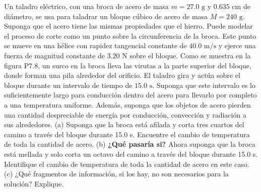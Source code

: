 \item Un taladro eléctrico, con una broca de acero de masa $m = 27.0 \text{ g}$ y $0.635 \text{ cm}$ de diámetro, se usa para taladrar un bloque cúbico de acero de masa $M = 240 \text{ g}$. Suponga que el acero tiene las mismas propiedades que el hierro. Puede modelar el proceso de corte como un punto sobre la circunferencia de la broca. Este punto se mueve en una hélice con rapidez tangencial constante de $40.0 \text{ m/s}$ y ejerce una fuerza de magnitud constante de $3.20 \text{ N}$ sobre el bloque. Como se muestra en la figura P7.8, un surco en la broca lleva las virutas a la parte superior del bloque, donde forman una pila alrededor del orificio. El taladro gira y actúa sobre el bloque durante un intervalo de tiempo de $15.0 \text{ s}$. Suponga que este intervalo es lo suficientemente largo para conducción dentro del acero para llevarlo por completo a una temperatura uniforme. Además, suponga que los objetos de acero pierden una cantidad despreciable de energía por conducción, convección y radiación a sus alrededores. 
(a) Suponga que la broca está afilada y corta tres cuartos del camino a través del bloque durante 15.0 s. Encuentre el cambio de temperatura de toda la cantidad de acero. 
(b) \textbf{¿Qué pasaría si?} Ahora suponga que la broca está mellada y solo corta un octavo del camino a través del bloque durante 15.0 s. Identifique el cambio de temperatura de toda la cantidad de acero en este caso. 
(c) ¿Qué fragmentos de información, si los hay, no son necesarios para la solución? Explique.
